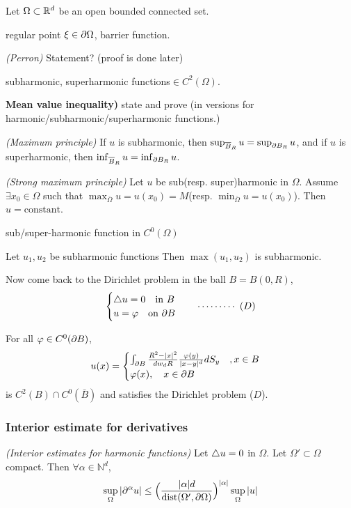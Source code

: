 \documentclass[10pt,a4paper]{article}
\begin{document}
Let $\Omega \subset \mathbb{R}^d$ be an open bounded connected set.
\s

 regular point $\xi \in \partial \Omega$, barrier function.

\thm \emph{(Perron)} Statement? (proof is done later)

 subharmonic, superharmonic functions$\in C^2(\Omega)$.
\s

\textbf{Mean value inequality)} state and prove (in versions for harmonic/subharmonic/superharmonic functions.)
\s

 \emph{(Maximum principle)} If $u$ is subharmonic, then $\sup_{\overline{B}_R} u = \sup_{\partial B_R} u$, and if $u$ is superharmonic, then $\inf_{\overline{B}_R} u = \inf_{\partial B_R} u$.
\s

 \emph{(Strong maximum principle)} Let $u$ be sub(resp. super)harmonic in $\Omega$. Assume $\exists x_0 \in \Omega$ such that $\max_{\bar{\Omega}} u = u(x_0) = M$(resp. $\min_{\bar{\Omega}} u = u(x_0)$). Then $u = \text{constant}$.
\s

 sub/super-harmonic function in $C^0(\Omega)$
\s 

\lem Let $u_1, u_2$ be subharmonic functions Then $\max(u_1, u_2)$ is subharmonic.
\s

Now come back to the Dirichlet problem in the ball $B = B(0, R)$,
\begin{align*}
\begin{cases}
\triangle u =0 \quad \text{in } B\\
u = \varphi \quad \text{on } \partial B
\end{cases} \quad \cdots\cdots\cdots\,\,(D)
\end{align*}
\s

\thm For all $\varphi \in C^0(\partial B)$,
\begin{align*}
u(x) = \begin{cases}
\int_{\partial B} \frac{R^2 - |x|^2}{dw_d R} \frac{\varphi(y)}{|x-y|^d} dS_y \quad, x\in B\\
\varphi(x), \quad x\in \partial B
\end{cases}
\end{align*}
is $C^2(B) \cap C^0(\bar{B})$ and satisfies the Dirichlet problem ($D$). 

\subsubsection*{Interior estimate for derivatives}

 \emph{(Interior estimates for harmonic functions)} Let $\triangle u =0$ in $\Omega$. Let $\Omega' \subset \Omega$ compact. Then $\forall \alpha \in \mathbb{N}^d$,
\begin{align*}
\sup_{\Omega} |\partial^{\alpha}u| \leq \Big( \frac{|\alpha|d}{\text{dist}(\Omega', \partial \Omega)}\Big)^{|\alpha|} \sup_{\Omega} |u|
\end{align*}
\s
\end{document}
